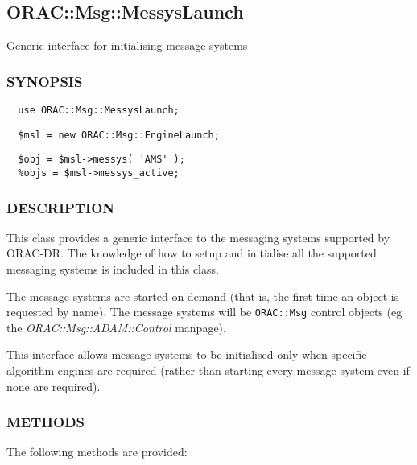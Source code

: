 \subsection{ORAC::Msg::MessysLaunch\label{ORAC::Msg::MessysLaunch}}

Generic interface for initialising message systems

\subsubsection*{SYNOPSIS\label{ORAC::Msg::MessysLaunch_SYNOPSIS}}\begin{verbatim}
  use ORAC::Msg::MessysLaunch;
\end{verbatim}
\begin{verbatim}
  $msl = new ORAC::Msg::EngineLaunch;
\end{verbatim}
\begin{verbatim}
  $obj = $msl->messys( 'AMS' );
  %objs = $msl->messys_active;
\end{verbatim}
\subsubsection*{DESCRIPTION\label{ORAC::Msg::MessysLaunch_DESCRIPTION}}

This class provides a generic interface to the messaging systems
supported by ORAC-DR. The knowledge of how to setup and initialise
all the supported messaging systems is included in this class.



The message systems are started on demand (that is, the first
time an object is requested by name). The message systems will
be \texttt{ORAC::Msg} control objects (eg the \emph{ORAC::Msg::ADAM::Control} manpage).



This interface allows message systems to be initialised only
when specific algorithm engines are required (rather than
starting every message system even if none are required).

\subsubsection*{METHODS\label{ORAC::Msg::MessysLaunch_METHODS}}

The following methods are provided:

